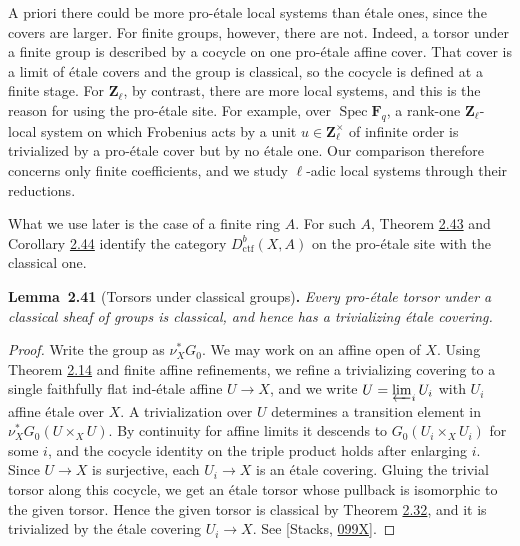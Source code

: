 \documentclass[11pt]{article}
\newenvironment{bpstatement}[2]{\par\addvspace{0.6\baselineskip}\noindent\textbf{#1}#2\textbf{.}\enspace\ignorespaces}
  {\par\addvspace{0.4\baselineskip}}
\newenvironment{bpstatementit}[2]{\begin{bpstatement}{#1}{#2}\itshape\ignorespaces}{\end{bpstatement}}
\begin{document}
A priori there could be more pro-étale local systems than étale ones, since the covers are larger. For finite groups, however, there are not. Indeed, a torsor under a finite group is described by a cocycle on one pro-étale affine cover. That cover is a limit of étale covers and the group is classical, so the cocycle is defined at a finite stage. For \(\mathbf Z_\ell\), by contrast, there are more local systems, and this is the reason for using the pro-étale site. For example, over \(\operatorname{Spec}\mathbf F_q\), a rank-one \(\mathbf Z_\ell\)-local system on which Frobenius acts by a unit \(u\in\mathbf Z_\ell^\times\) of infinite order is trivialized by a pro-étale cover but by no étale one. Our comparison therefore concerns only finite coefficients, and we study \(\ell\)-adic local systems through their reductions.

What we use later is the case of a finite ring \(A\). For such \(A\), Theorem \hyperref[bp129]{2.43} and Corollary \hyperref[bp132]{2.44} identify the category \(D^b_{\mathrm{ctf}}(X,A)\) on the pro-étale site with the classical one.

\label{bp123}%
\begin{bpstatementit}{Lemma~2.41}{ (Torsors under classical groups)}
Every pro-étale torsor under a classical sheaf of groups is classical, and hence has a trivializing étale covering.
\end{bpstatementit}

\begin{proof}[{Proof}]\label{bp124}%
Write the group as \(\nu_X^*G_0\). We may work on an affine open of \(X\). Using Theorem \hyperref[bp42]{2.14} and finite affine refinements, we refine a trivializing covering to a single faithfully flat ind-étale affine \(U\to X\), and we write \(U=\varprojlim_iU_i\) with \(U_i\) affine étale over \(X\). A trivialization over \(U\) determines a transition element in \(\nu_X^*G_0(U\times_XU)\). By continuity for affine limits it descends to \(G_0(U_i\times_XU_i)\) for some \(i\), and the cocycle identity on the triple product holds after enlarging \(i\). Since \(U\to X\) is surjective, each \(U_i\to X\) is an étale covering. Gluing the trivial torsor along this cocycle, we get an étale torsor whose pullback is isomorphic to the given torsor. Hence the given torsor is classical by Theorem \hyperref[bp95]{2.32}, and it is trivialized by the étale covering \(U_i\to X\). See [Stacks, \href{https://stacks.math.columbia.edu/tag/099X}{099X}].
\end{proof}
\end{document}
